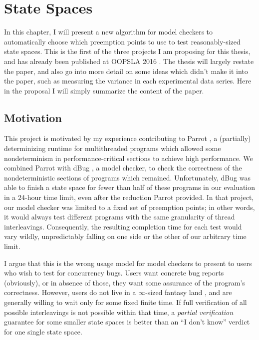 \chapter{State Spaces}
\label{chap:quicksand}

In this chapter, I will present a new algorithm for model checkers to automatically choose which preemption points to use to test reasonably-sized state spaces.
This is the first of the three projects I am proposing for this thesis, and has already been published at OOPSLA 2016 \cite{quicksand}.
The thesis will largely restate the paper, and also go into more detail on some ideas which didn't make it into the paper, such as measuring the variance in each experimental data series.
Here in the proposal I will simply summarize the content of the paper.

\section{Motivation}
\label{sec:qs-motivation}

This project is motivated by my experience contributing to Parrot \cite{parrot},
a (partially) determinizing runtime for multithreaded programs which allowed some nondeterminism in performance-critical sections to achieve high performance.
We combined Parrot with dBug \cite{dbug-ssv}, a model checker, to check the correctness of the nondeterministic sections of programs which remained.
Unfortunately, dBug was able to finish a state space for fewer than half of these programs in our evaluation in a 24-hour time limit,
even after the reduction Parrot provided.
In that project, our model checker was limited to a fixed set of preemption points;
in other words, it would always test different programs with the same granularity of thread interleavings.
Consequently, the resulting completion time for each test would vary wildly,
unpredictably falling on one side or the other of our arbitrary time limit.

I argue that this is the wrong usage model for model checkers to present to users who wish to test for concurrency bugs.
Users want concrete bug reports (obviously), or in absence of those, they want some assurance of the program's correctness.
However, users do not live in a $\infty$-sized fantasy land \cite{vargomax},
and are generally willing to wait only for some fixed finite time.
If full verification of all possible interleavings is not possible within that time,
a {\em partial verification} guarantee for some smaller state spaces is better than an ``I don't know'' verdict for one single state space.

